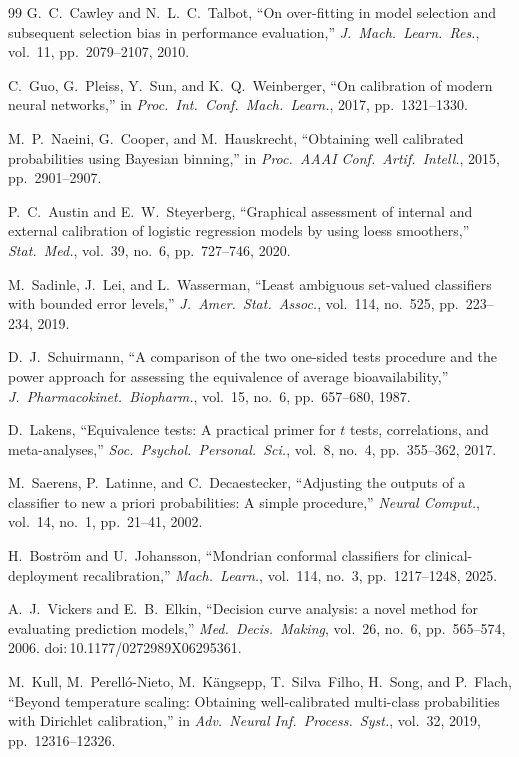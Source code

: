 \documentclass[10pt,letterpaper]{article}
\begin{document}
\begin{thebibliography}{99}
G.~C.~Cawley and N.~L.~C.~Talbot, ``On over-fitting in model selection and subsequent selection bias in performance evaluation,'' \textit{J.\ Mach.\ Learn.\ Res.}, vol.~11, pp.~2079--2107, 2010.

C.~Guo, G.~Pleiss, Y.~Sun, and K.~Q.~Weinberger, ``On calibration of modern neural networks,'' in \textit{Proc.\ Int.\ Conf.\ Mach.\ Learn.}, 2017, pp.~1321--1330.

M.~P.~Naeini, G.~Cooper, and M.~Hauskrecht, ``Obtaining well calibrated probabilities using Bayesian binning,'' in \textit{Proc.\ AAAI Conf.\ Artif.\ Intell.}, 2015, pp.~2901--2907.

P.~C.~Austin and E.~W.~Steyerberg, ``Graphical assessment of internal and external calibration of logistic regression models by using loess smoothers,'' \textit{Stat.\ Med.}, vol.~39, no.~6, pp.~727--746, 2020.

M.~Sadinle, J.~Lei, and L.~Wasserman, ``Least ambiguous set-valued classifiers with bounded error levels,'' \textit{J.\ Amer.\ Stat.\ Assoc.}, vol.~114, no.~525, pp.~223--234, 2019.

D.~J.~Schuirmann, ``A comparison of the two one-sided tests procedure and the power approach for assessing the equivalence of average bioavailability,'' \textit{J.\ Pharmacokinet.\ Biopharm.}, vol.~15, no.~6, pp.~657--680, 1987.

D.~Lakens, ``Equivalence tests: A practical primer for $t$ tests, correlations, and meta-analyses,'' \textit{Soc.\ Psychol.\ Personal.\ Sci.}, vol.~8, no.~4, pp.~355--362, 2017.

M.~Saerens, P.~Latinne, and C.~Decaestecker, ``Adjusting the outputs of a classifier to new a priori probabilities: A simple procedure,'' \textit{Neural Comput.}, vol.~14, no.~1, pp.~21--41, 2002.

H.~Bostr\"{o}m and U.~Johansson, ``Mondrian conformal classifiers for clinical-deployment recalibration,'' \textit{Mach.\ Learn.}, vol.~114, no.~3, pp.~1217--1248, 2025.

A.~J.~Vickers and E.~B.~Elkin, ``Decision curve analysis: a novel method for evaluating prediction models,'' \textit{Med.\ Decis.\ Making}, vol.~26, no.~6, pp.~565--574, 2006. doi:\,10.1177/0272989X06295361.

M.~Kull, M.~Perell\'{o}-Nieto, M.~K\"{a}ngsepp, T.~Silva~Filho, H.~Song, and P.~Flach, ``Beyond temperature scaling: Obtaining well-calibrated multi-class probabilities with Dirichlet calibration,'' in \textit{Adv.\ Neural Inf.\ Process.\ Syst.}, vol.~32, 2019, pp.~12316--12326.


\end{thebibliography}
\end{document}
